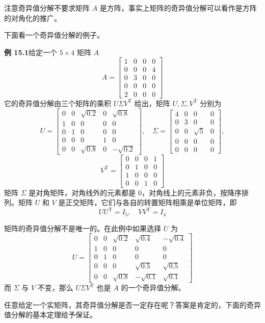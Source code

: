 \documentclass[UTF8,12pt,a4paper,fontset=fandol]{ctexart}
\begin{document}
注意奇异值分解不要求矩阵 $A$ 是方阵，事实上矩阵的奇异值分解可以看作是方阵的对角化的推广。

下面看一个奇异值分解的例子。

\noindent\textbf{例 15.1}\quad 给定一个 $5\times4$ 矩阵 $A$
\[
A=
\begin{bmatrix}
1&0&0&0\\
0&0&0&4\\
0&3&0&0\\
0&0&0&0\\
2&0&0&0
\end{bmatrix}
\]
它的奇异值分解由三个矩阵的乘积 $U\Sigma V^{\mathrm{T}}$ 给出，矩阵 $U,\Sigma,V^{\mathrm{T}}$ 分别为
\[
U=
\begin{bmatrix}
0&0&\sqrt{0.2}&0&\sqrt{0.8}\\
1&0&0&0&0\\
0&1&0&0&0\\
0&0&0&1&0\\
0&0&\sqrt{0.8}&0&-\sqrt{0.2}
\end{bmatrix},
\quad
\Sigma=
\begin{bmatrix}
4&0&0&0\\
0&3&0&0\\
0&0&\sqrt5&0\\
0&0&0&0\\
0&0&0&0
\end{bmatrix},
\]
\[
V^{\mathrm{T}}=
\begin{bmatrix}
0&0&0&1\\
0&1&0&0\\
1&0&0&0\\
0&0&1&0
\end{bmatrix}
\]
矩阵 $\Sigma$ 是对角矩阵，对角线外的元素都是 0，对角线上的元素非负，按降序排列。矩阵 $U$ 和 $V$ 是正交矩阵，它们与各自的转置矩阵相乘是单位矩阵，即
\[
UU^{\mathrm{T}}=I_5,\quad VV^{\mathrm{T}}=I_4
\]

矩阵的奇异值分解不是唯一的。在此例中如果选择 $U$ 为
\[
U=
\begin{bmatrix}
0&0&\sqrt{0.2}&\sqrt{0.4}&-\sqrt{0.4}\\
1&0&0&0&0\\
0&1&0&0&0\\
0&0&0&\sqrt{0.5}&\sqrt{0.5}\\
0&0&\sqrt{0.8}&-\sqrt{0.1}&\sqrt{0.1}
\end{bmatrix}
\]
而 $\Sigma$ 与 $V$ 不变，那么 $U\Sigma V^{\mathrm{T}}$ 也是 $A$ 的一个奇异值分解。

任意给定一个实矩阵，其奇异值分解是否一定存在呢？答案是肯定的，下面的奇异值分解的基本定理给予保证。
\end{document}
